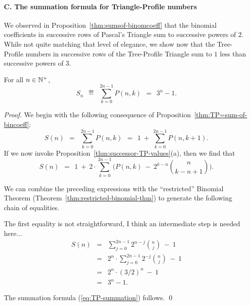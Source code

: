 \paragraph{\small\sf C. The summation formula for Triangle-Profile numbers}

We observed in Proposition~\ref{thm:sumsof-binomcoeff} that the
binomial coefficients in successive rows of Pascal's Triangle sum to
successive powers of $2$.  While not quite matching that level of
elegance, we show now that the Tree-Profile numbers in successive rows
of the Tree-Profile Triangle sum to $1$ less than successive powers of
$3$.

\begin{prop}
\label{thm:TP-summation}
For all $n \in \mathbb{N}^+$,
\begin{equation}
\label{eq:TP-summation}
S_n \ \ \eqdef \ \ \sum_{k=0}^{2n-1} P(n,k) \ \ = \ \ 3^n -1.
\end{equation}
\end{prop}
 
\begin{proof}
We begin with the following consequence of
Proposition~\ref{thm:TP=sum-of-bincoeff}:
\[
S(n) \ \ = \ \
  \sum_{k=0}^{2n-1} P(n,k)
     \ \ = \ \
  1 \ + \ \sum_{k=0}^{2n-1} P(n,k+1).
\]
If we now invoke Proposition~\ref{thm:successor-TP-values}(a), then we
find that
\[
S(n) \ \ = \ \ 1 \ + \ 2 \cdot \sum_{k=0}^{2n-1} 
  \big( P(n,k) \ - \ 2^{k-n} {n \choose {k-n+1}} \big).
\]

We can combine the preceding expressions with the ``restricted''
Binomial Theorem (Theorem~\ref{thm:restricted-binomial-thm}) to
generate the following chain of equalities.

{\Denis The first equality is not straightforward, I think an intermediate step is needed here...}
\begin{eqnarray*}
S(n) & = & 
\sum_{j=0}^{2n-1} 2^{n-j} {n \choose j} \ - \ 1  \\
     & = &
2^n \cdot \sum_{j=0}^{2n-1} 2^{-j} {n \choose j} \ - \ 1 \\
     & = & 
2^n \cdot (3/2)^n \ - \ 1 \\
     & = &
3^n -1.
\end{eqnarray*}

The summation formula (\ref{eq:TP-summation}) follows.
\qed
\end{proof}

